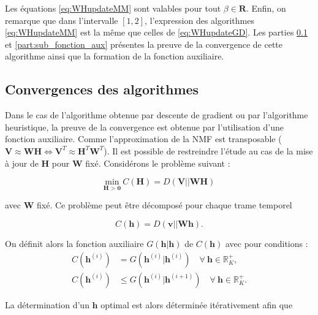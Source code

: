 Les équations \ref{eq:WHupdateMM} sont valables pour tout $\beta \in \mathbf{R}$. Enfin, on remarque que dans l'intervalle $\left[1,2 \right]$, l'expression des algorithmes  \ref{eq:WHupdateMM} est la même que celles de \ref{eq:WHupdateGD}. Les parties \ref{part:convergenceMM} et \ref{part:sub_fonction_aux} présentes la preuve de la convergence de cette algorithme ainsi que la formation de la fonction auxiliaire. 

\subsection{Convergences des algorithmes}\label{part:convergenceMM}

Dans le cas de l'algorithme obtenue par descente de gradient ou par l'algorithme heuristique, la preuve de la convergence est obtenue par l'utilisation d'une fonction auxiliaire. Comme l'approximation de la NMF est transposable ($\mathbf{V} \approx \mathbf{WH} \Leftrightarrow \mathbf{V}^T \approx \mathbf{H}^T \mathbf{W}^T$). Il est possible de restreindre l'étude au cas de la mise à jour de $\mathbf{H}$ pour $\mathbf{W}$ fixé. Considérons le problème suivant :  

\begin{equation}
\underset{\textbf{H > 0}}{\text{min}}~C(\mathbf{H}) = D(\mathbf{V} \vert\vert \mathbf{WH})
\end{equation}

avec $\mathbf{W}$ fixé. Ce problème peut être décomposé pour chaque trame temporel

\begin{equation}\label{eq:costFunctionMM}
C(\mathbf{h}) = D(\mathbf{v}\vert\vert \mathbf{Wh}).
\end{equation}

On définit alors la fonction auxiliaire $G(\mathbf{h}\vert \mathbf{h})$ de $C(\mathbf{h})$ avec pour conditions : 
\begin{subequations}\label{eqs:conditionAux}
\begin{align}
C(\mathbf{h}^{\left(i\right)}) &= G(\mathbf{h}^{(i)}\vert \mathbf{h}^{(i)}) \quad \forall~\mathbf{h} \in \mathbb{R}^+_K,\\
C(\mathbf{h}^{(i)}) &\leq G(\mathbf{h}^{(i)} \vert \mathbf{h}^{(i+1)}) \quad \forall~\mathbf{h} \in \mathbb{R}^+_K.
\end{align}
\end{subequations}

La détermination d'un $\mathbf{h}$ optimal est alors déterminée itérativement afin que 

